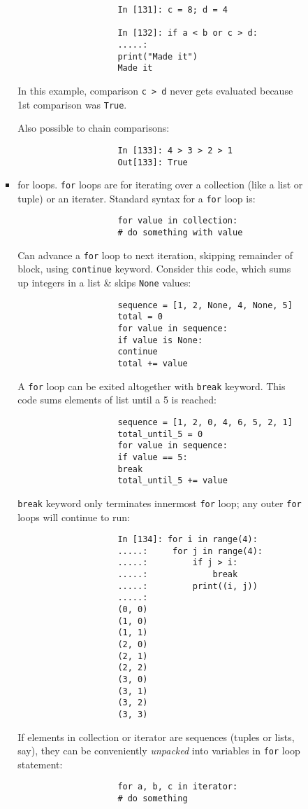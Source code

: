 \documentclass{article}
\begin{document}
\begin{itemize}
\begin{itemize}
\begin{itemize}
\begin{itemize}
\begin{verbatim}
					In [131]: c = 8; d = 4
					
					In [132]: if a < b or c > d:
					.....:
					print("Made it")
					Made it
				\end{verbatim}
				In this example, comparison {\tt c > d} never gets evaluated because 1st comparison was {\tt True}.
				
				Also possible to chain comparisons:
				\begin{verbatim}
					In [133]: 4 > 3 > 2 > 1
					Out[133]: True
				\end{verbatim}
				\item {\sf for loops.} {\tt for} loops are for iterating over a collection (like a list or tuple) or an iterater. Standard syntax for a {\tt for} loop is:
				\begin{verbatim}
					for value in collection:
					# do something with value
				\end{verbatim}
				Can advance a {\tt for} loop to next iteration, skipping remainder of block, using {\tt continue} keyword. Consider this code, which sums up integers in a list \& skips {\tt None} values:
				\begin{verbatim}
					sequence = [1, 2, None, 4, None, 5]
					total = 0
					for value in sequence:
					if value is None:
					continue
					total += value
				\end{verbatim}
				A {\tt for} loop can be exited altogether with {\tt break} keyword. This code sums elements of list until a 5 is reached:
				\begin{verbatim}
					sequence = [1, 2, 0, 4, 6, 5, 2, 1]
					total_until_5 = 0
					for value in sequence:
					if value == 5:
					break
					total_until_5 += value
				\end{verbatim}
				{\tt break} keyword only terminates innermost {\tt for} loop; any outer {\tt for} loops will continue to run:
				\begin{verbatim}
					In [134]: for i in range(4):
					.....:     for j in range(4):
					.....:         if j > i:
					.....:             break
					.....:         print((i, j))
					.....:
					(0, 0)
					(1, 0)
					(1, 1)
					(2, 0)
					(2, 1)
					(2, 2)
					(3, 0)
					(3, 1)
					(3, 2)
					(3, 3)
				\end{verbatim}
				If elements in collection or iterator are sequences (tuples or lists, say), they can be conveniently {\it unpacked} into variables in {\tt for} loop statement:
				\begin{verbatim}
					for a, b, c in iterator:
					# do something

\end{verbatim}
\end{itemize}
\end{itemize}
\end{itemize}
\end{itemize}
\end{document}
